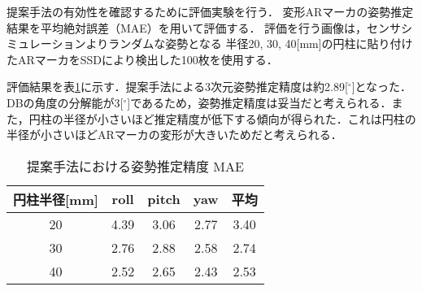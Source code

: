 \documentclass{jsarticle}
\begin{document}


提案手法の有効性を確認するために評価実験を行う．
変形ARマーカの姿勢推定結果を平均絶対誤差（MAE）を用いて評価する．
評価を行う画像は，センサシミュレーションよりランダムな姿勢となる	
半径20, 30, 40[mm]の円柱に貼り付けたARマーカをSSDにより検出した100枚を使用する．

評価結果を表\ref{hyouka}に示す．提案手法による3次元姿勢推定精度は約2.89[$^\circ$]となった．DBの角度の分解能が3[$^\circ$]であるため，姿勢推定精度は妥当だと考えられる．また，円柱の半径が小さいほど推定精度が低下する傾向が得られた．これは円柱の半径が小さいほどARマーカの変形が大きいためだと考えられる．



\begin{table}[h]
        \vspace{0zh}
          \begin{center}
            \caption{提案手法における姿勢推定精度 MAE}
            \label{hyouka}
            \begin{tabular}{c|c|c|c|c} \hline
              円柱半径[mm]   & roll& pitch & yaw&平均 \\ \hline
              20& 4.39 & 3.06 & 2.77 &3.40\\ \hline
              30&2.76 & 2.88 & 2.58& 2.74 \\ \hline
              40&2.52 &2.65  &2.43&2.53 \\ \hline
              \end{tabular}
          \end{center}
        \vspace{-1.0zh}
\end{table}



\end{document}
